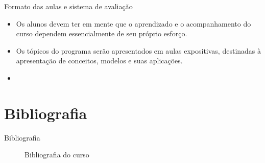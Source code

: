 \documentclass[10pt]{beamer}
\begin{document}
\begin{frame}{Formato das aulas e sistema de avaliação}
    \begin{itemize}
        \item Os alunos devem ter em mente que o aprendizado e o acompanhamento do curso dependem essencialmente de seu próprio esforço.\bigskip

        \item Os tópicos do programa serão apresentados em aulas expositivas, destinadas à apresentação de conceitos, modelos e suas aplicações.\bigskip

        \item[\emoji{warning}] 
    \end{itemize}
\end{frame}

\section{Bibliografia}
\begin{frame}{Bibliografia}
    \begin{figure}
        \centering
         \qquad
         \qquad
        \caption{Bibliografia do curso}
        \label{fig2}
    \end{figure}
\end{frame}
\end{document}
